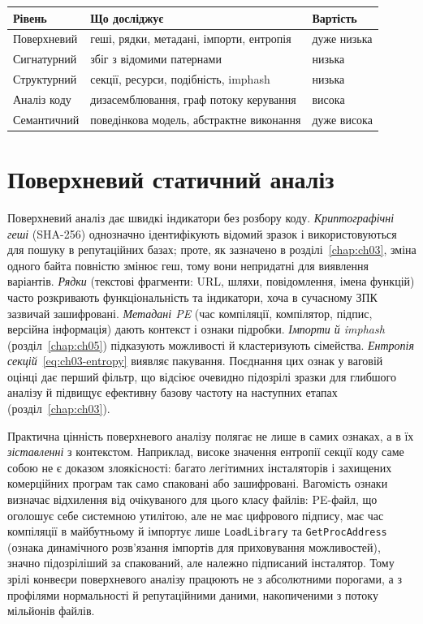 
\begin{center}\footnotesize
\begin{tabularx}{\linewidth}{L{24mm} Y L{16mm}}
\toprule
Рівень & Що досліджує & Вартість \\
\midrule
Поверхневий & геші, рядки, метадані, імпорти, ентропія & дуже низька \\
Сигнатурний & збіг з відомими патернами & низька \\
Структурний & секції, ресурси, подібність, imphash & низька \\
Аналіз коду & дизасемблювання, граф потоку керування & висока \\
Семантичний & поведінкова модель, абстрактне виконання & дуже висока \\
\bottomrule
\end{tabularx}
\end{center}

\section{Поверхневий статичний аналіз}\label{sec:ch06-surface}

Поверхневий аналіз дає швидкі індикатори без розбору коду. \emph{Криптографічні геші} (SHA-256) однозначно ідентифікують відомий зразок і використовуються для пошуку в репутаційних базах; проте, як зазначено в розділі~\ref{chap:ch03}, зміна одного байта повністю змінює геш, тому вони непридатні для виявлення варіантів. \emph{Рядки} (текстові фрагменти: URL, шляхи, повідомлення, імена функцій) часто розкривають функціональність та індикатори, хоча в сучасному ЗПК зазвичай зашифровані. \emph{Метадані PE} (час компіляції, компілятор, підпис, версійна інформація) дають контекст і ознаки підробки. \emph{Імпорти й imphash} (розділ~\ref{chap:ch05}) підказують можливості й кластеризують сімейства. \emph{Ентропія секцій}~\eqref{eq:ch03-entropy} виявляє пакування. Поєднання цих ознак у ваговій оцінці дає перший фільтр, що відсіює очевидно підозрілі зразки для глибшого аналізу й підвищує ефективну базову частоту на наступних етапах (розділ~\ref{chap:ch03}).

Практична цінність поверхневого аналізу полягає не лише в самих ознаках, а в їх \emph{зіставленні} з контекстом. Наприклад, високе значення ентропії секції коду саме собою не є доказом злоякісності: багато легітимних інсталяторів і захищених комерційних програм так само спаковані або зашифровані. Вагомість ознаки визначає відхилення від очікуваного для цього класу файлів: PE-файл, що оголошує себе системною утилітою, але не має цифрового підпису, має час компіляції в майбутньому й імпортує лише \texttt{LoadLibrary} та \texttt{GetProcAddress} (ознака динамічного розв'язання імпортів для приховування можливостей), значно підозріліший за спакований, але належно підписаний інсталятор. Тому зрілі конвеєри поверхневого аналізу працюють не з абсолютними порогами, а з профілями нормальності й репутаційними даними, накопиченими з потоку мільйонів файлів.

